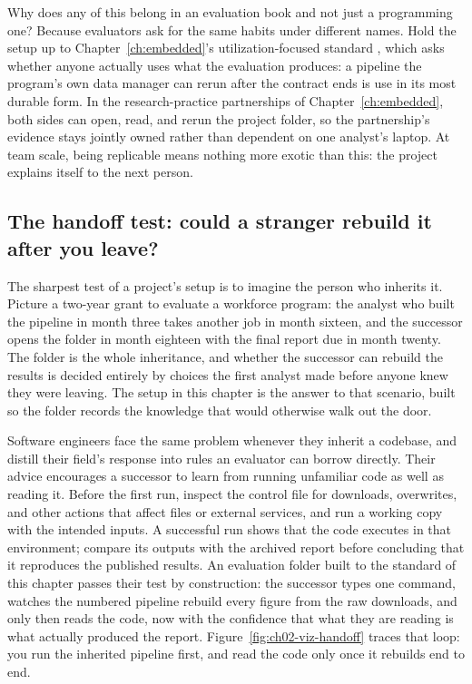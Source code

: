 \documentclass[
    a4paper,
    fontsize=10pt,
    twoside=true,
    numbers=noenddot,
]{kaobook}
\begin{document}
Why does any of this belong in an evaluation book and not just a programming one? Because evaluators ask for the same habits under different names. Hold the setup up to Chapter~\ref{ch:embedded}'s utilization-focused standard \parencite{patton2008utilization}, which asks whether anyone actually uses what the evaluation produces: a pipeline the program's own data manager can rerun after the contract ends is use in its most durable form. In the research-practice partnerships of Chapter~\ref{ch:embedded}, both sides can open, read, and rerun the project folder, so the partnership's evidence stays jointly owned rather than dependent on one analyst's laptop. At team scale, being replicable means nothing more exotic than this: the project explains itself to the next person.

\subsection{The handoff test: could a stranger rebuild it after you leave?}\label{sec:ch02-handoff}
The sharpest test of a project's setup is to imagine the person who inherits it. Picture a two-year grant to evaluate a workforce program: the analyst who built the pipeline in month three takes another job in month sixteen, and the successor opens the folder in month eighteen with the final report due in month twenty. The folder is the whole inheritance, and whether the successor can rebuild the results is decided entirely by choices the first analyst made before anyone knew they were leaving. The setup in this chapter is the answer to that scenario, built so the folder records the knowledge that would otherwise walk out the door.

Software engineers face the same problem whenever they inherit a codebase, and \textcite{pilgrim2023code} distill their field's response into rules an evaluator can borrow directly. Their advice encourages a successor to learn from running unfamiliar code as well as reading it. Before the first run, inspect the control file for downloads, overwrites, and other actions that affect files or external services, and run a working copy with the intended inputs. A successful run shows that the code executes in that environment; compare its outputs with the archived report before concluding that it reproduces the published results. An evaluation folder built to the standard of this chapter passes their test by construction: the successor types one command, watches the numbered pipeline rebuild every figure from the raw downloads, and only then reads the code, now with the confidence that what they are reading is what actually produced the report. Figure~\ref{fig:ch02-viz-handoff} traces that loop: you run the inherited pipeline first, and read the code only once it rebuilds end to end.
\end{document}
